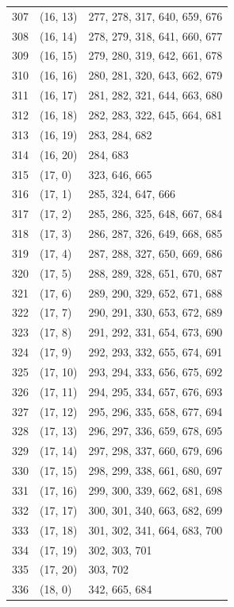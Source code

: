 \documentclass{article}
\begin{document}
\begin{longtable}{lll}
  307 & (16, 13) & 277, 278, 317, 640, 659, 676 \\
  308 & (16, 14) & 278, 279, 318, 641, 660, 677 \\
  309 & (16, 15) & 279, 280, 319, 642, 661, 678 \\
  310 & (16, 16) & 280, 281, 320, 643, 662, 679 \\
  311 & (16, 17) & 281, 282, 321, 644, 663, 680 \\
  312 & (16, 18) & 282, 283, 322, 645, 664, 681 \\
  313 & (16, 19) & 283, 284, 682 \\
  314 & (16, 20) & 284, 683 \\
  315 & (17, 0) & 323, 646, 665 \\
  316 & (17, 1) & 285, 324, 647, 666 \\
  317 & (17, 2) & 285, 286, 325, 648, 667, 684 \\
  318 & (17, 3) & 286, 287, 326, 649, 668, 685 \\
  319 & (17, 4) & 287, 288, 327, 650, 669, 686 \\
  320 & (17, 5) & 288, 289, 328, 651, 670, 687 \\
  321 & (17, 6) & 289, 290, 329, 652, 671, 688 \\
  322 & (17, 7) & 290, 291, 330, 653, 672, 689 \\
  323 & (17, 8) & 291, 292, 331, 654, 673, 690 \\
  324 & (17, 9) & 292, 293, 332, 655, 674, 691 \\
  325 & (17, 10) & 293, 294, 333, 656, 675, 692 \\
  326 & (17, 11) & 294, 295, 334, 657, 676, 693 \\
  327 & (17, 12) & 295, 296, 335, 658, 677, 694 \\
  328 & (17, 13) & 296, 297, 336, 659, 678, 695 \\
  329 & (17, 14) & 297, 298, 337, 660, 679, 696 \\
  330 & (17, 15) & 298, 299, 338, 661, 680, 697 \\
  331 & (17, 16) & 299, 300, 339, 662, 681, 698 \\
  332 & (17, 17) & 300, 301, 340, 663, 682, 699 \\
  333 & (17, 18) & 301, 302, 341, 664, 683, 700 \\
  334 & (17, 19) & 302, 303, 701 \\
  335 & (17, 20) & 303, 702 \\
  336 & (18, 0) & 342, 665, 684 \\

\end{longtable}
\end{document}
